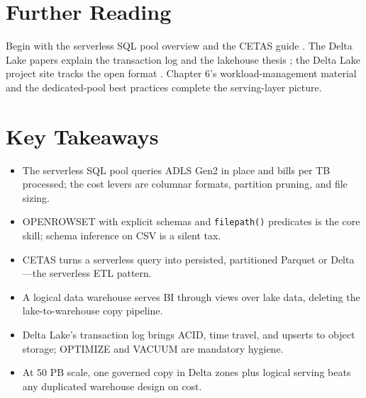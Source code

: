 \section{Further Reading}
Begin with the serverless SQL pool overview \cite{microsoft2025synapseServerless} and the CETAS guide \cite{microsoft2025cetas}. The Delta Lake papers explain the transaction log and the lakehouse thesis \cite{armbrust2020delta,armbrust2021lakehouse}; the Delta Lake project site tracks the open format \cite{deltaio2025delta}. Chapter 6's workload-management material and the dedicated-pool best practices \cite{microsoft2025synapseDedicatedBest} complete the serving-layer picture.

\section*{Key Takeaways}
\begin{itemize}
    \item The serverless SQL pool queries ADLS Gen2 in place and bills per TB processed; the cost levers are columnar formats, partition pruning, and file sizing.
    \item OPENROWSET with explicit schemas and \texttt{filepath()} predicates is the core skill; schema inference on CSV is a silent tax.
    \item CETAS turns a serverless query into persisted, partitioned Parquet or Delta---the serverless ETL pattern.
    \item A logical data warehouse serves BI through views over lake data, deleting the lake-to-warehouse copy pipeline.
    \item Delta Lake's transaction log brings ACID, time travel, and upserts to object storage; OPTIMIZE and VACUUM are mandatory hygiene.
    \item At 50 PB scale, one governed copy in Delta zones plus logical serving beats any duplicated warehouse design on cost.
\end{itemize}

